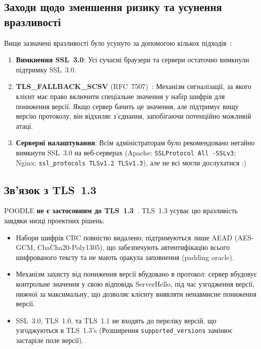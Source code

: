 \subsection{Заходи щодо зменшення ризику та усунення вразливості}

Вище зазначені вразливості було усунуто за допомогою кількох підходів~\cite{rfc7507, redhat_poodle}:

\begin{enumerate}
    \item \textbf{Вимкнення SSL~3.0}: Усі сучасні браузери та сервери остаточно вимкнули підтримку SSL~3.0.
    \item \textbf{TLS\_FALLBACK\_SCSV} (RFC~7507)~\cite{rfc7507}: Механізм сигналізації, за якого клієнт має право 
        включити спеціальне значення у набір шифрів для пониження версії. Якщо сервер бачить це значення, але підтримує 
        вищу версію протоколу, він відхиляє з'єднання, запобігаючи потенційно можливій атаці.
    \item \textbf{Серверні налаштування}: Всім адміністраторам було рекомендовано негайно вимкнути SSL~3.0 на 
        веб-серверах (Apache: \texttt{SSLProtocol All -SSLv3}; Nginx: \texttt{ssl\_protocols TLSv1.2 TLSv1.3}), але 
        не всі могли дослухатися :)
\end{enumerate}

\subsection{Зв'язок з TLS~1.3}

POODLE \textbf{не є застосовним до TLS~1.3}~\cite{rfc8446}. TLS~1.3 усуває цю вразливість завдяки низці проектних 
рішень:
\begin{itemize}
    \item Набори шифрів CBC повністю видалено; підтримуються лише AEAD (AES-GCM, ChaCha20-Poly1305), що забезпечують автентифікацію 
        всього шифрованого тексту та не мають оракула заповнення (padding oracle).
    \item Механізм захисту від пониження версії вбудовано в протокол: сервер вбудовує контрольне значення у свою відповідь 
        ServerHello, під час узгодження версії, нижчої за  максимальну, що дозволяє клієнту виявляти ненавмисне пониження 
        версії.
    \item SSL~3.0, TLS~1.0, та TLS~1.1 не входять до переліку версій, що узгоджуються в TLS~1.3's (Розширення \texttt{supported\_versions}
        замінює застаріле поле версії).
\end{itemize}

